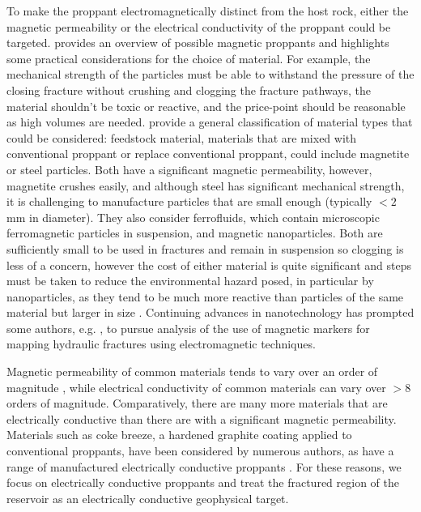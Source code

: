 

To make the proppant electromagnetically distinct from the host rock, either the magnetic permeability or the electrical conductivity of the proppant could be targeted. \citep{Zawadzki2016} provides an overview of possible magnetic proppants and highlights some practical considerations for the choice of material. For example, the mechanical strength of the particles must be able to withstand the pressure of the closing fracture without crushing and clogging the fracture pathways, the material shouldn’t be toxic or reactive, and the price-point should be reasonable as high volumes are needed. \citep{Zawadzki2016} provide a general classification of material types that could be considered: feedstock material, materials that are mixed with conventional proppant or replace conventional proppant, could include magnetite or steel particles. Both have a significant magnetic permeability, however, magnetite crushes easily, and although steel has significant mechanical strength, it is challenging to manufacture particles that are small enough (typically $< 2$mm in diameter). They also consider ferrofluids, which contain microscopic ferromagnetic particles in suspension, and magnetic nanoparticles. Both are sufficiently small to be used in fractures and remain in suspension so clogging is less of a concern, however the cost of either material is quite significant and steps must be taken to reduce the environmental hazard posed, in particular by nanoparticles, as they tend to be much more reactive than particles of the same material but larger in size \cite{Zawadzki2016}. Continuing advances in nanotechnology has prompted some authors, e.g. \citep{Rahmani2014}, to pursue analysis of the use of magnetic markers for mapping hydraulic fractures using electromagnetic techniques.

Magnetic permeability of common materials tends to vary over an order of magnitude \cite{Telford1990}, while electrical conductivity of common materials can vary over $> 8$ orders of magnitude. Comparatively, there are many more materials that are electrically conductive than there are with a significant magnetic permeability. Materials such as coke breeze, a hardened graphite coating applied to conventional proppants, have been considered by numerous authors, as have a range of manufactured electrically conductive proppants \citep{Pardo2013, Hoversten2015, Weiss2015, Labrecque2016, Hu2018}. For these reasons, we focus on electrically conductive proppants and treat the fractured region of the reservoir as an electrically conductive geophysical target.

